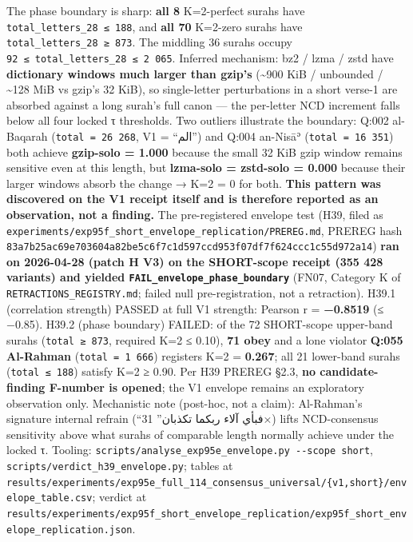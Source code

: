 \documentclass[
]{article}
\begin{document}
The phase boundary is sharp: \textbf{all 8} K=2-perfect surahs have
\texttt{total\_letters\_28\ ≤\ 188}, and \textbf{all 70} K=2-zero surahs
have \texttt{total\_letters\_28\ ≥\ 873}. The middling 36 surahs occupy
\texttt{92\ ≤\ total\_letters\_28\ ≤\ 2\ 065}. Inferred mechanism: bz2 /
lzma / zstd have \textbf{dictionary windows much larger than gzip's}
(\textasciitilde900 KiB / unbounded / \textasciitilde128 MiB vs gzip's
32 KiB), so single-letter perturbations in a short verse-1 are absorbed
against a long surah's full canon --- the per-letter NCD increment falls
below all four locked τ thresholds. Two outliers illustrate the
boundary: Q:002 al-Baqarah (\texttt{total\ =\ 26\ 268}, V1 = ``الم'')
and Q:004 an-Nisāʾ (\texttt{total\ =\ 16\ 351}) both achieve
\textbf{gzip-solo = 1.000} because the small 32 KiB gzip window remains
sensitive even at this length, but \textbf{lzma-solo = zstd-solo =
0.000} because their larger windows absorb the change → K=2 = 0 for
both. \textbf{This pattern was discovered on the V1 receipt itself and
is therefore reported as an observation, not a finding.} The
pre-registered envelope test (H39, filed as
\texttt{experiments/exp95f\_short\_envelope\_replication/PREREG.md},
PREREG hash
\texttt{83a7b25ac69e703604a82be5c6f7c1d597ccd953f07df7f624ccc1c55d972a14})
\textbf{ran on 2026-04-28 (patch H V3) on the SHORT-scope receipt (355
428 variants) and yielded \texttt{FAIL\_envelope\_phase\_boundary}}
(FN07, Category K of \texttt{RETRACTIONS\_REGISTRY.md}; failed null
pre-registration, not a retraction). H39.1 (correlation strength) PASSED
at full V1 strength: Pearson r = \textbf{−0.8519} (≤ −0.85). H39.2
(phase boundary) FAILED: of the 72 SHORT-scope upper-band surahs
(\texttt{total\ ≥\ 873}, required K=2 ≤ 0.10), \textbf{71 obey} and a
lone violator \textbf{Q:055 Al-Rahman} (\texttt{total\ =\ 1\ 666})
registers K=2 = \textbf{0.267}; all 21 lower-band surahs
(\texttt{total\ ≤\ 188}) satisfy K=2 ≥ 0.90. Per H39 PREREG §2.3,
\textbf{no candidate-finding F-number is opened}; the V1 envelope
remains an exploratory observation only. Mechanistic note (post-hoc, not
a claim): Al-Rahman's signature internal refrain (``فبأي آلاء ربكما
تكذبان'' 31×) lifts NCD-consensus sensitivity above what surahs of
comparable length normally achieve under the locked τ. Tooling:
\texttt{scripts/analyse\_exp95e\_envelope.py\ -\/-scope\ short},
\texttt{scripts/verdict\_h39\_envelope.py}; tables at
\texttt{results/experiments/exp95e\_full\_114\_consensus\_universal/\{v1,short\}/envelope\_table.csv};
verdict at
\texttt{results/experiments/exp95f\_short\_envelope\_replication/exp95f\_short\_envelope\_replication.json}.
\end{document}
